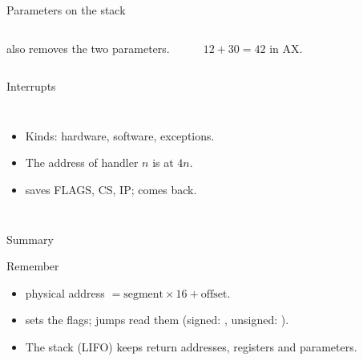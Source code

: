 \documentclass[aspectratio=169, 11pt, t, xcolor={table}]{beamer}
\begin{document}
\begin{frame}{Parameters on the stack}
    \begin{columns}[T]
        \small {} also removes the two parameters.
        \begin{center}
        \end{center}
        \small $12 + 30 = 42$ in AX.
    \end{columns}
\end{frame}

\begin{frame}{Interrupts}
    \begin{columns}[T]
        \small
        \begin{itemize}
            \item Kinds: hardware, software, exceptions.
            \item The address of handler $n$ is at $4n$.
            \item {} saves FLAGS, CS, IP;  comes back.
        \end{itemize}
    \end{columns}
\end{frame}

\begin{frame}{Summary}
    \begin{tbox}{\faCheckCircle\quad Remember}
        \begin{itemize}
            \item physical address $= \text{segment} \times 16 + \text{offset}$.
            \item {} sets the flags; jumps read them (signed: , unsigned: ).
            \item The stack (LIFO) keeps return addresses, registers and parameters.
        \end{itemize}
    \end{tbox}
\end{frame}
\end{document}
